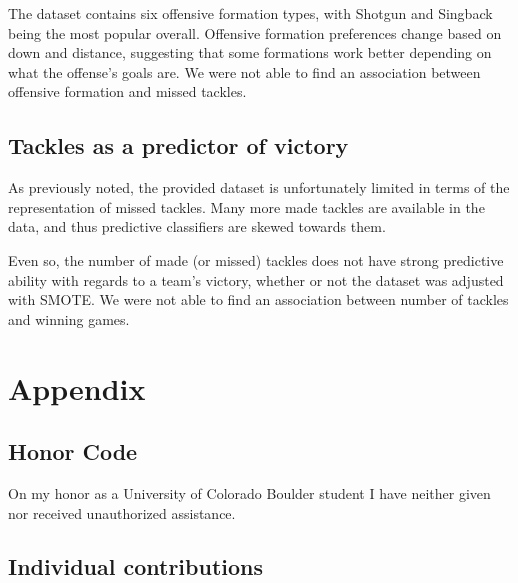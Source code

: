 \documentclass[bibtex, sigconf, hyperref={colorlinks=true,linkcolor=blue,urlcolor=blue}]{acmart}
\begin{document}
The dataset contains six offensive formation types, with Shotgun and
Singback being the most popular overall. Offensive formation preferences change
based on down and distance, suggesting that some formations work better
depending on what the offense's goals are. We were not able to find an
association between offensive formation and missed tackles.

\subsection{Tackles as a predictor of victory}

As previously noted, the provided dataset is unfortunately limited in terms of the representation of
missed tackles. Many more made tackles are available in the data, and thus predictive classifiers are
skewed towards them.

Even so, the number of made (or missed) tackles does not have strong predictive ability with regards to
a team's victory, whether or not the dataset was adjusted with SMOTE. We were not able to find an
association between number of tackles and winning games.



\nocite{*}

\section{Appendix}

\subsection{Honor Code}

On my honor as a University of Colorado Boulder student I have neither given nor
received unauthorized assistance.

\subsection{Individual contributions}
\end{document}
